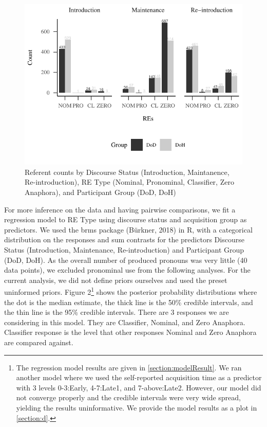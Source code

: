\documentclass[]{elsarticle} %
\begin{document}
\begin{figure}
\centering
\includegraphics{revised_manuscript_files/figure-latex/fig-count-plot-1.pdf}
\caption{Referent counts by Discourse Status (Introduction, Maintanence,
Re-introduction), RE Type (Nominal, Pronominal, Classifier, Zero
Anaphora), and Participant Group (DoD, DoH)}
\end{figure}

For more inference on the data and having pairwise comparisons, we fit a
regression model to RE Type using discourse status and acquisition group
as predictors. We used the brms package (Bürkner, 2018) in R, with a
categorical distribution on the responses and sum contrasts for the
predictors Discourse Status (Introduction, Maintenance, Re-introduction)
and Participant Group (DoD, DoH). As the overall number of produced
pronouns was very little (40 data points), we excluded pronominal use
from the following analyses. For the current analysis, we did not define
priors ourselves and used the preset uninformed priors. Figure
2\footnote{The regression model results are given in
  \ref{section:modelResult}. We ran another model where we used the
  self-reported acquisition time as a predictor with 3 levels 0-3:Early,
  4-7:Late1, and 7-above:Late2. However, our model did not converge
  properly and the credible intervals were very wide spread, yielding
  the results uninformative. We provide the model results as a plot in
  \ref{section:d}.} shows the posterior probability distributions where
the dot is the median estimate, the thick line is the 50\% credible
intervals, and the thin line is the 95\% credible intervals. There are 3
responses we are considering in this model. They are Classifier,
Nominal, and Zero Anaphora. Classifier response is the level that other
responses Nominal and Zero Anaphora are compared against.
\end{document}
